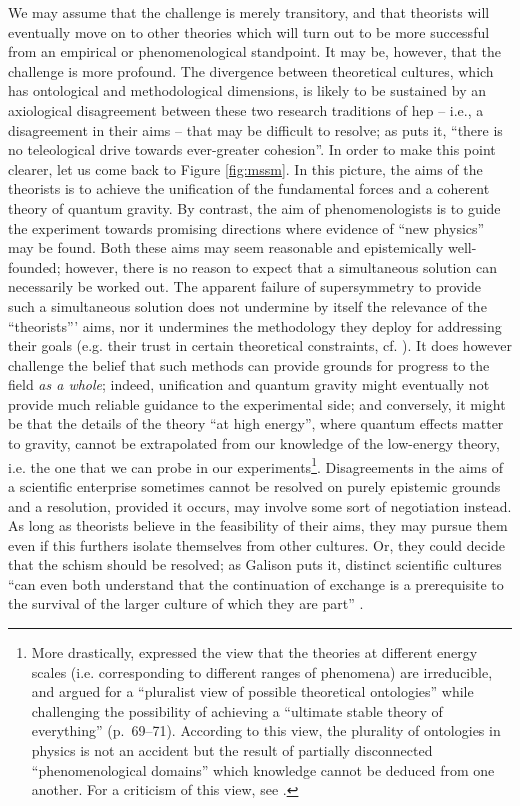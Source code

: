 \documentclass[smallextended]{svjour3}
\begin{document}
We may assume that the challenge is merely transitory, and that theorists will eventually move on to other theories which will turn out to be more successful from an empirical or phenomenological standpoint. It may be, however, that the challenge is more profound. The divergence between theoretical cultures, which has ontological and methodological dimensions, is likely to be sustained by an axiological disagreement \citep{Ritson2021,Laudan1984} between these two research traditions of \gls{hep} -- i.e., a disagreement in their aims -- that may be difficult to resolve; as \citet[p.~805]{galison1997image} puts it, ``there is no teleological drive towards ever-greater cohesion''. In order to make this point clearer, let us come back to Figure \ref{fig:mssm}. In this picture, the aims of the theorists is to achieve the unification of the fundamental forces and a coherent theory of quantum gravity. By contrast, the aim of phenomenologists is to guide the experiment towards promising directions where evidence of ``new physics'' may be found. Both these aims may seem reasonable and epistemically well-founded; however, there is no reason to expect that a simultaneous solution can necessarily be worked out. The apparent failure of supersymmetry to provide such a simultaneous solution does not undermine by itself the relevance of the ``theorists''' aims, nor it undermines the methodology they deploy for addressing their goals (e.g. their trust in certain theoretical constraints, cf. \citealt{Galison1995}). It does however challenge the belief that such methods can provide grounds for progress to the field \textit{as a whole}; indeed, unification and quantum gravity might eventually not provide much reliable guidance to the experimental side; and conversely, it might be that the details of the theory ``at high energy'', where quantum effects matter to gravity, cannot be extrapolated from our knowledge of the low-energy theory, i.e. the one that we can probe in our experiments\footnote{More drastically, \citet{Cao1993} expressed the view that the theories at different energy scales (i.e. corresponding to different ranges of phenomena) are irreducible, and argued for a ``pluralist view of possible theoretical ontologies'' while challenging the possibility of achieving a ``ultimate stable theory  of everything'' (p.~69--71). According to this view, the plurality of ontologies in physics is not an accident but the result of partially disconnected ``phenomenological domains'' which knowledge cannot be deduced from one another. For a criticism of this view, see \citealt{Rivat2020}.}. Disagreements in the aims of a scientific enterprise sometimes cannot be resolved on purely epistemic grounds and a resolution, provided it occurs, may involve some sort of negotiation instead.  As long as theorists believe in the feasibility of their aims, they may pursue them even if this furthers isolate themselves from other cultures. Or, they could decide that the schism should be resolved; as Galison puts it, distinct scientific cultures ``can even both understand that the continuation of exchange is a prerequisite to the survival of the larger culture of which they are part'' \citep[p.~803]{galison1997image}.%
\end{document}
